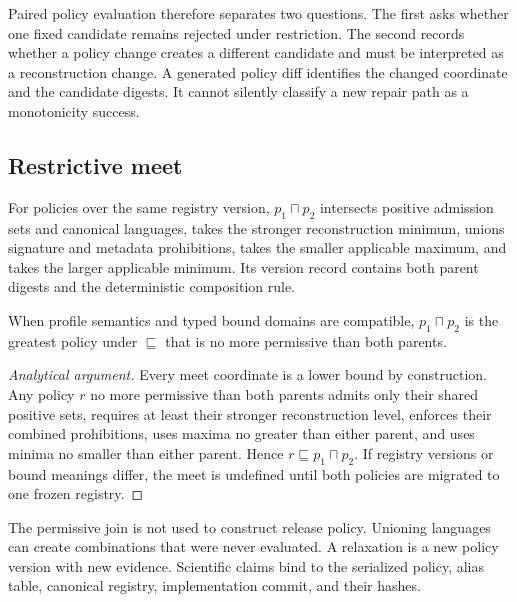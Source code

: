 Paired policy evaluation therefore separates two questions. The first asks
whether one fixed candidate remains rejected under restriction. The second
records whether a policy change creates a different candidate and must be
interpreted as a reconstruction change. A generated policy diff identifies the
changed coordinate and the candidate digests. It cannot silently classify a new
repair path as a monotonicity success.

\subsection{Restrictive meet}

For policies over the same registry version, $p_1\sqcap p_2$ intersects positive
admission sets and canonical languages, takes the stronger reconstruction
minimum, unions signature and metadata prohibitions, takes the smaller
applicable maximum, and takes the larger applicable minimum. Its version record
contains both parent digests and the deterministic composition rule.

\begin{proposition}
\label{prop:policy-meet}
When profile semantics and typed bound domains are compatible,
$p_1\sqcap p_2$ is the greatest policy under $\sqsubseteq$ that is no more
permissive than both parents.
\end{proposition}

\begin{proof}[Analytical argument]
Every meet coordinate is a lower bound by construction. Any policy $r$ no more
permissive than both parents admits only their shared positive sets, requires at
least their stronger reconstruction level, enforces their combined
prohibitions, uses maxima no greater than either parent, and uses minima no
smaller than either parent. Hence $r\sqsubseteq p_1\sqcap p_2$. If registry
versions or bound meanings differ, the meet is undefined until both policies
are migrated to one frozen registry.
\end{proof}

The permissive join is not used to construct release policy. Unioning languages
can create combinations that were never evaluated. A relaxation is a new policy
version with new evidence. Scientific claims bind to the serialized policy,
alias table, canonical registry, implementation commit, and their hashes.
